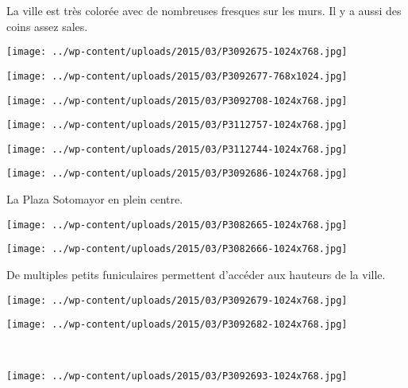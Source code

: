 La ville est très colorée avec de nombreuses fresques sur les murs. Il y a aussi des coins assez sales.
\begin{center} \texttt{[image: ../wp-content/uploads/2015/03/P3092675-1024x768.jpg]} \end{center}
\begin{center} \texttt{[image: ../wp-content/uploads/2015/03/P3092677-768x1024.jpg]} \end{center}
\begin{center} \texttt{[image: ../wp-content/uploads/2015/03/P3092708-1024x768.jpg]} \end{center}
\begin{center} \texttt{[image: ../wp-content/uploads/2015/03/P3112757-1024x768.jpg]} \end{center}
\begin{center} \texttt{[image: ../wp-content/uploads/2015/03/P3112744-1024x768.jpg]} \end{center}
\begin{center} \texttt{[image: ../wp-content/uploads/2015/03/P3092686-1024x768.jpg]} \end{center}

 La Plaza Sotomayor en plein centre.
\begin{center} \texttt{[image: ../wp-content/uploads/2015/03/P3082665-1024x768.jpg]} \end{center}
\begin{center} \texttt{[image: ../wp-content/uploads/2015/03/P3082666-1024x768.jpg]} \end{center}

 De multiples petits funiculaires permettent d'accéder aux hauteurs de la ville.
\begin{center} \texttt{[image: ../wp-content/uploads/2015/03/P3092679-1024x768.jpg]} \end{center}
\vspace{-\topsep}

\pagebreak
\begin{center} \texttt{[image: ../wp-content/uploads/2015/03/P3092682-1024x768.jpg]} \end{center}
~\\

\begin{center} \texttt{[image: ../wp-content/uploads/2015/03/P3092693-1024x768.jpg]} \end{center}
\vspace{-\topsep}
\vspace{-3mm}

